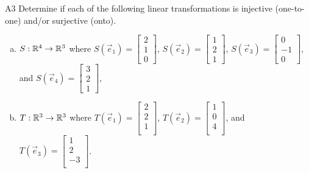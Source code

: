 \documentclass{sbgLAsemi}
\begin{document}
\begin{problem}{A3}
Determine if each of the following linear transformations is injective (one-to-one) and/or surjective (onto).
\begin{enumerate}[(a)]
\item
  \(S: \mathbb{R}^4 \rightarrow \mathbb{R}^3\) where
  \(S(\vec e_1)=\begin{bmatrix}
    2  \\
    1 \\
    0
  \end{bmatrix}\),
  \(S(\vec e_2)=\begin{bmatrix}
    1  \\
    2\\
    1
  \end{bmatrix}\),
  \(S(\vec e_3)=\begin{bmatrix}
    0  \\
    -1 \\
    0
  \end{bmatrix}\), and
  \(S(\vec e_4)=\begin{bmatrix}
    3 \\
    2\\
    1
  \end{bmatrix}\),
\item
  \(T: \mathbb{R}^3 \rightarrow \mathbb{R}^3\) where
  \(T(\vec e_1)=\begin{bmatrix}
    2  \\
    2 \\
    1\\
  \end{bmatrix}\),
  \(T(\vec e_2)=\begin{bmatrix}
     1 \\
     0 \\
     4 \\
  \end{bmatrix}\), and
  \(T(\vec e_3)=\begin{bmatrix}
     1 \\
     2 \\
     -3 \\
  \end{bmatrix}\).
\end{enumerate}
\end{problem}
\end{document}
